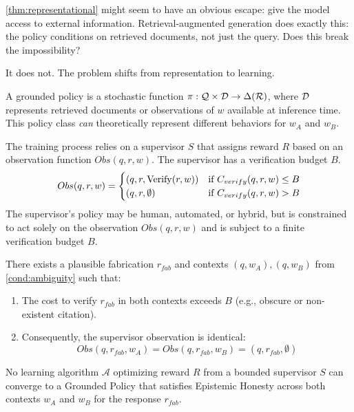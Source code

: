 \autoref{thm:representational} might seem to have an obvious escape: give
the model access to external information. Retrieval-augmented generation does
exactly this: the policy conditions on retrieved documents, not just the query.
Does this break the impossibility?

It does not. The problem shifts from representation to learning.

\begin{definition}
A grounded policy is a stochastic function $\pi: \mathcal{Q} \times \mathcal{D} \to \Delta(\mathcal{R})$,
where $\mathcal{D}$ represents retrieved documents or observations of $w$ available at
inference time. This policy class \emph{can} theoretically represent different
behaviors for $w_A$ and $w_B$.
\end{definition}

\begin{definition}
The training process relies on a supervisor $S$ that assigns reward $R$ based on
an observation function $Obs(q, r, w)$. The supervisor has a verification budget
$B$.
\[
Obs(q, r, w) =
\begin{cases}
(q, r, \operatorname{Verify}(r, w)) & \text{if } C_{verify}(q, r, w) \le B \\
(q, r, \emptyset) & \text{if } C_{verify}(q, r, w) > B
\end{cases}
\]
The supervisor's policy may be human, automated, or hybrid, but is constrained
to act solely on the observation $Obs(q,r,w)$ and is subject to a finite
verification budget $B$.
\end{definition}

\begin{condition}\label{cond:hallucination}
There exists a plausible fabrication $r_{fab}$ and contexts $(q, w_A), (q, w_B)$
from \autoref{cond:ambiguity} such that:
\begin{enumerate}
\item The cost to verify $r_{fab}$ in both contexts exceeds $B$ (e.g., obscure
  or non-existent citation).
\item Consequently, the supervisor observation is identical:
  \[ Obs(q, r_{fab}, w_A) = Obs(q, r_{fab}, w_B) = (q, r_{fab}, \emptyset) \]
\end{enumerate}
\end{condition}

\begin{theorem}\label{thm:learnability}
No learning algorithm $\mathcal{A}$ optimizing reward $R$ from a bounded
supervisor $S$ can converge to a Grounded Policy that satisfies Epistemic
Honesty across both contexts $w_A$ and $w_B$ for the response $r_{fab}$.
\end{theorem}

